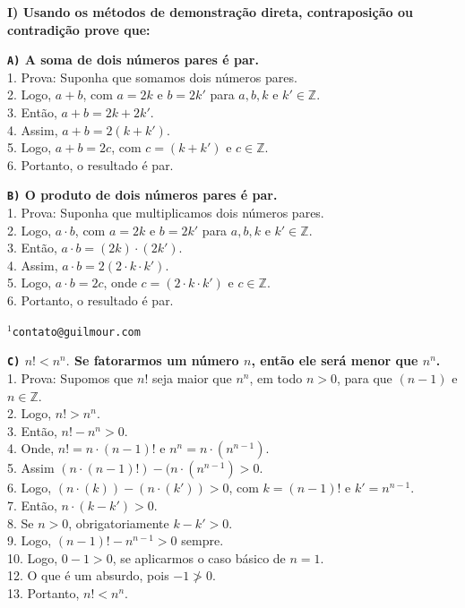 \documentclass[12pt, a4paper]{article}
\newcommand{\Z}{\mathbb{Z}}
\begin{document}
    \vskip5mm
\begin{flushleft}

\textbf{I) Usando os métodos de demonstração direta, contraposição ou contradição prove que: \\}
\vskip5mm

\textbf{\textbf{\texttt{A)}} A soma de dois números pares é par.\\}
\textsf{1. Prova: Suponha que somamos dois números pares.
\\2. Logo, $a+b $, com $a = 2k$ e $b = 2k'$  para  $a, b, k$ e $k' \in \Z $. 
\\3. Então, $a+b = 2k + 2k'$. 
\\4. Assim, $a+b = 2(k + k')$.
\\5. Logo,  $a+b = 2c$, com $c = (k + k')$ e $c \in \Z$.
\\6. Portanto, o resultado é par.}

\vskip10mm

\textbf{\textbf{\texttt{B)}} O produto de dois números pares é par.\\}
\textsf{1. Prova: Suponha que multiplicamos dois números pares.
\\2. Logo, $a \cdot b$, com $a = 2k$ e $b = 2k'$  para  $a, b, k$ e $k' \in \Z $. 
\\3. Então, $a \cdot b = (2k) \cdot (2k')$. 
\\4. Assim, $a \cdot b = 2(2 \cdot k \cdot k') $.
\\5. Logo, $a \cdot b = 2c $, onde $ c = (2 \cdot k \cdot k')$ e $c \in \Z$.
\\6. Portanto, o resultado é par.}

\vskip13mm
\begin{flushright}
	\texttt{\footnotesize $^1$contato@guilmour.com}
\end{flushright}
\pagebreak


\textbf{\textbf{\texttt{C)}} $n!<n^n.$ Se fatorarmos um número $n$, então ele será menor que $n^n$.\\}
\textsf{1. Prova: Supomos que $n!$ seja maior que $n^n$, em todo $n>0$, para que $(n-1)$ e $n \in \Z$.
\\2. Logo, $n! > n^n$.
\\3. Então, $n! - n^n > 0$.
\\4. Onde, $n! = n \cdot (n-1)!$ e $n^n = n \cdot (n^{n-1})$.
\\5. Assim $(n \cdot (n-1)!) - (n \cdot (n^{n-1}) > 0$.
\\6. Logo, $(n \cdot (k)) - (n \cdot (k')) > 0$, com $ k=(n-1)!$ e $k'= n^{n-1}$.
\\7. Então, $n \cdot (k-k') > 0$.
\\8. Se $n > 0$, obrigatoriamente $k-k'> 0 $.
\\9. Logo, $(n-1)! - n^{n-1} > 0$ sempre.
\\10. Logo, $0 - 1 > 0$, se aplicarmos o caso básico de $n = 1$.
\\12. O que é um absurdo, pois $-1 \ngtr 0$.
\\13. Portanto, $n!<n^n$.}


\end{flushleft}
\end{document}
